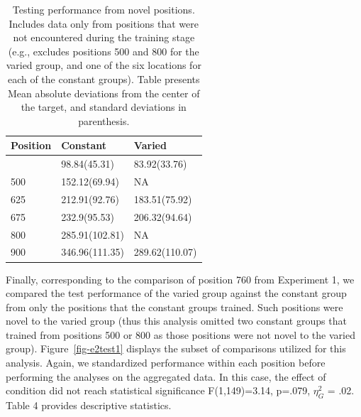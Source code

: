 \documentclass[
  11pt,
  letterpaper,
]{article}
\begin{document}
\begin{longtable}[]{@{}lll@{}}

\caption{\label{tbl-e2table2}Testing performance from novel positions.
Includes data only from positions that were not encountered during the
training stage (e.g., excludes positions 500 and 800 for the varied
group, and one of the six locations for each of the constant groups).
Table presents Mean absolute deviations from the center of the target,
and standard deviations in parenthesis.}

\tabularnewline

\toprule\noalign{}
Position & Constant & Varied \\
\midrule\noalign{}
\endhead
\bottomrule\noalign{}
\endlastfoot
400 & 98.84(45.31) & 83.92(33.76) \\
500 & 152.12(69.94) & NA \\
625 & 212.91(92.76) & 183.51(75.92) \\
675 & 232.9(95.53) & 206.32(94.64) \\
800 & 285.91(102.81) & NA \\
900 & 346.96(111.35) & 289.62(110.07) \\

\end{longtable}

Finally, corresponding to the comparison of position 760 from Experiment
1, we compared the test performance of the varied group against the
constant group from only the positions that the constant groups trained.
Such positions were novel to the varied group (thus this analysis
omitted two constant groups that trained from positions 500 or 800 as
those positions were not novel to the varied group).
Figure~\ref{fig-e2test1} displays the subset of comparisons utilized for
this analysis. Again, we standardized performance within each position
before performing the analyses on the aggregated data. In this case, the
effect of condition did not reach statistical significance
F(1,149)=3.14, p=.079, \(\eta^{2}_G\) = .02. Table 4 provides
descriptive statistics.
\end{document}
